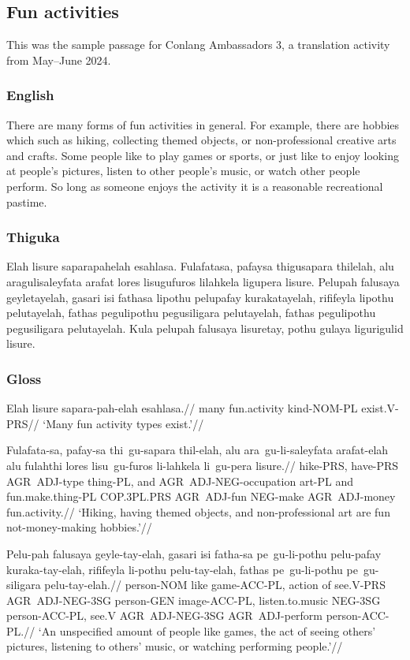 \newpage

\subsection{Fun activities}
This was the sample passage for Conlang Ambassadors 3, a translation activity from May--June 2024.
\subsubsection*{English}
There are many forms of fun activities in general.
For example, there are hobbies which such as hiking, collecting themed objects, or non-professional creative arts and crafts.
Some people like to play games or sports, or just like to enjoy looking at people's pictures, listen to other people's music, or watch other people perform.
So long as someone enjoys the activity it is a reasonable recreational pastime.

\subsubsection*{Thiguka}
Elah lisure saparapahelah esahlasa.
Fulafatasa, pafaysa thigusapara thilelah, alu aragulisaleyfata arafat lores lisugufuros lilahkela ligupera lisure.
Pelupah falusaya geyletayelah, gasari isi fathasa lipothu pelupafay kurakatayelah, rififeyla lipothu pelutayelah, fathas pegulipothu pegusiligara pelutayelah, fathas pegulipothu pegusiligara pelutayelah.
Kula pelupah falusaya lisuretay, pothu gulaya ligurigulid lisure.

\subsubsection*{Gloss}
\ex
\begingl
\gla Elah lisure sapara-pah-elah esahlasa.//
\glb many fun.activity kind-NOM-PL exist.V-PRS//
\glft `Many fun activity types exist.'//
\endgl
\xe

\ex
\begingl
\gla  Fulafata-sa, pafay-sa thi~gu-sapara thil-elah, alu ara~gu-li-saleyfata arafat-elah alu fulahthi lores lisu~gu-furos li-lahkela li~gu-pera lisure.//
\glb  hike-PRS, have-PRS AGR~ADJ-type thing-PL, and AGR~ADJ-NEG-occupation art-PL and fun.make.thing-PL COP.3PL.PRS AGR~ADJ-fun NEG-make AGR~ADJ-money fun.activity.//
\glft `Hiking, having themed objects, and non-professional art are fun not-money-making hobbies.'//
\endgl
\xe

\ex
\begingl
\gla  Pelu-pah falusaya geyle-tay-elah, gasari isi fatha-sa pe~gu-li-pothu pelu-pafay kuraka-tay-elah, rififeyla li-pothu pelu-tay-elah, fathas pe~gu-li-pothu pe~gu-siligara pelu-tay-elah.//
\glb   person-NOM like game-ACC-PL, action of see.V-PRS AGR~ADJ-NEG-3SG person-GEN image-ACC-PL, listen.to.music NEG-3SG person-ACC-PL, see.V AGR~ADJ-NEG-3SG AGR~ADJ-perform person-ACC-PL.//
\glft `An unspecified amount of people like games, the act of seeing others' pictures, listening to others' music, or watching performing people.'//
\endgl
\xe

